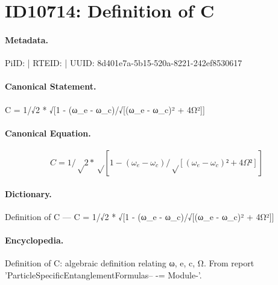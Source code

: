 \section*{ID10714: Definition of C}
\paragraph{Metadata.}
PiID:  | RTEID:  | UUID: 8d401e7a-5b15-520a-8221-242ef8530617

\paragraph{Canonical Statement.}
C = 1/√2 * √[1 - (ω\_e - ω\_c)/√[(ω\_e - ω\_c)² + 4Ω²]]

\paragraph{Canonical Equation.}
\[
C = 1/√2 * √[1 - (ω_e - ω_c)/√[(ω_e - ω_c)² + 4Ω²]]
\]

\paragraph{Dictionary.}
Definition of C — C = 1/√2 * √[1 - (ω\_e - ω\_c)/√[(ω\_e - ω\_c)² + 4Ω²]]

\paragraph{Encyclopedia.}
Definition of C: algebraic definition relating ω, e, c, Ω. From report 'ParticleSpecificEntanglementFormulas-- -= Module-'.
